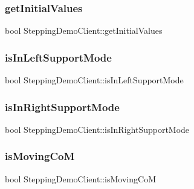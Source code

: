 \subsubsection{\texorpdfstring{get\+Initial\+Values}{getInitialValues}}
{\footnotesize\ttfamily bool Stepping\+Demo\+Client\+::get\+Initial\+Values\hspace{0.3cm}{\ttfamily [private]}}

\hypertarget{classSteppingDemoClient_a88b84ed8fc7808ea3fb68f2ec3d29ebe}{}\label{classSteppingDemoClient_a88b84ed8fc7808ea3fb68f2ec3d29ebe} 
\subsubsection{\texorpdfstring{is\+In\+Left\+Support\+Mode}{isInLeftSupportMode}}
{\footnotesize\ttfamily bool Stepping\+Demo\+Client\+::is\+In\+Left\+Support\+Mode\hspace{0.3cm}{\ttfamily [private]}}

\hypertarget{classSteppingDemoClient_a7697070e5db6c635aa2eff70bce29176}{}\label{classSteppingDemoClient_a7697070e5db6c635aa2eff70bce29176} 
\subsubsection{\texorpdfstring{is\+In\+Right\+Support\+Mode}{isInRightSupportMode}}
{\footnotesize\ttfamily bool Stepping\+Demo\+Client\+::is\+In\+Right\+Support\+Mode\hspace{0.3cm}{\ttfamily [private]}}

\hypertarget{classSteppingDemoClient_ad7e3950d053af7c1aca33b3e7c3b20c5}{}\label{classSteppingDemoClient_ad7e3950d053af7c1aca33b3e7c3b20c5} 
\subsubsection{\texorpdfstring{is\+Moving\+CoM}{isMovingCoM}}
{\footnotesize\ttfamily bool Stepping\+Demo\+Client\+::is\+Moving\+CoM\hspace{0.3cm}{\ttfamily [private]}}

